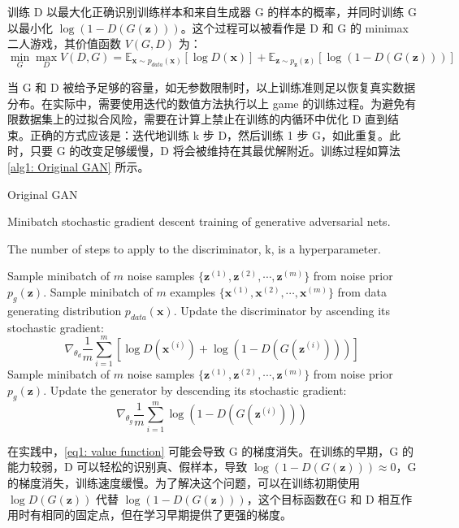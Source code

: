 \documentclass{myarticle}
\begin{document}
    训练 D 以最大化正确识别训练样本和来自生成器 G 的样本的概率，并同时训练 G 以最小化 $\log(1-D(G(\bm{z})))$。这个过程可以被看作是 D 和 G 的 minimax 二人游戏，其价值函数 $V(G,D)$ 为：
    \begin{equation}
        \min_G \max_D V(D,G)=\mathbb{E}_{\bm{x}\sim p_{data}(\bm{x})}[\log D(\bm{x})]+\mathbb{E}_{\bm{z}\sim p_{\bm{z}}(\bm{z})}[\log(1-D(G(\bm{z})))] \label{eq1: value function}
    \end{equation}

    当 G 和 D 被给予足够的容量，如无参数限制时，以上训练准则足以恢复真实数据分布。在实际中，需要使用迭代的数值方法执行以上 game 的训练过程。为避免有限数据集上的过拟合风险，需要在计算上禁止在训练的内循环中优化 D 直到结束。正确的方式应该是：迭代地训练 k 步 D，然后训练 1 步 G，如此重复。此时，只要 G 的改变足够缓慢，D 将会被维持在其最优解附近。训练过程如算法 \ref{alg1: Original GAN} 所示。

    \begin{algorithm}
        \caption{Original GAN}
        \label{alg1: Original GAN}
        Minibatch stochastic gradient descent training of generative adversarial nets.
        
        The number of steps to apply to the discriminator, k, is a hyperparameter.
        
        \begin{algorithmic}[1]
                    \State Sample minibatch of $m$ noise samples $\{\bm{z}^{(1)},\bm{z}^{(2)},\cdots,\bm{z}^{(m)}\}$ from noise prior $p_{g}(\bm{z})$.
                    \State Sample minibatch of $m$ examples $\{\bm{x}^{(1)},\bm{x}^{(2)},\cdots,\bm{x}^{(m)}\}$ from data generating distribution $p_{data}(\bm{x})$.
                    \State Update the discriminator by ascending its stochastic gradient:
                    $$\nabla_{\theta_d}\frac{1}{m}\sum_{i=1}^m[\log D(\bm{x}^{(i)})+\log(1-D(G(\bm{z}^{(i)})))]$$
                \EndFor
                \State Sample minibatch of $m$ noise samples $\{\bm{z}^{(1)},\bm{z}^{(2)},\cdots,\bm{z}^{(m)}\}$ from noise prior $p_{g}(\bm{z})$.
                \State Update the generator by descending its stochastic gradient:
                $$\nabla_{\theta_g}\frac{1}{m}\sum_{i=1}^m\log(1-D(G(\bm{z}^{(i)})))$$
            \EndFor
        \end{algorithmic}
    \end{algorithm}

    在实践中，\ref{eq1: value function} 可能会导致 G 的梯度消失。在训练的早期，G 的能力较弱，D 可以轻松的识别真、假样本，导致 $\log (1-D(G(\bm{z})))\approx 0$，G 的梯度消失，训练速度缓慢。为了解决这个问题，可以在训练初期使用 $\log D(G(\bm{z}))$ 代替 $\log(1-D(G(\bm{z})))$，这个目标函数在G 和 D 相互作用时有相同的固定点，但在学习早期提供了更强的梯度。
\end{document}
